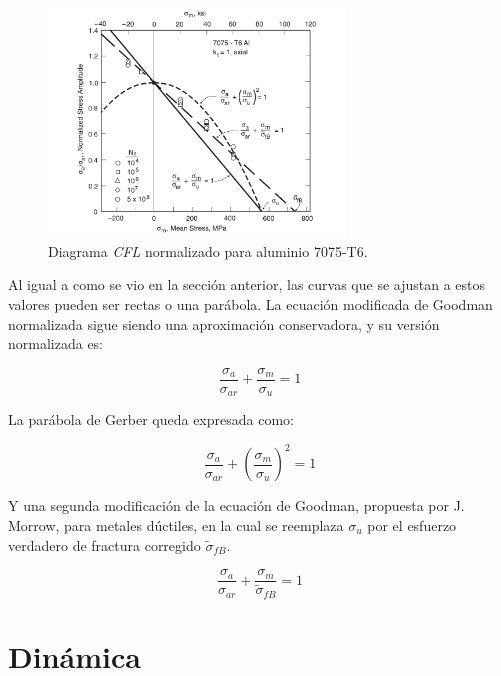\begin{figure}[h]
\centering
\includegraphics[width=0.7\textwidth]{Imagenes/cfl_norm.pdf}
\caption{Diagrama \textit{CFL} normalizado para aluminio 7075-T6. \cite{dowling2013mechanical}}
\label{fig:cfl_norm}
\end{figure}

Al igual a como se vio en la sección anterior, las curvas que se ajustan a estos valores pueden ser rectas o una parábola. La ecuación modificada de Goodman normalizada sigue siendo una aproximación conservadora, y su versión normalizada es:

\begin{equation} \label{eq:good_norm}
	\frac{\sigma_a}{\sigma_{ar}} + \frac{\sigma_m}{\sigma_u} = 1 
\end{equation}

La parábola de Gerber queda expresada como:

\begin{equation} \label{eq:par_gerber}
	\frac{\sigma_a}{\sigma_{ar}} + \left(\frac{\sigma_m}{\sigma_u}\right)^2 = 1 
\end{equation}

Y una segunda modificación de la ecuación de Goodman, propuesta por J. Morrow, para metales dúctiles, en la cual se reemplaza $\sigma_u$ por el esfuerzo verdadero de fractura corregido $\tilde{\sigma}_{fB}$.

\begin{equation} \label{eq:mod_goodduct}
	\frac{\sigma_a}{\sigma_{ar}} + \frac{\sigma_m}{\tilde{\sigma}_{fB}} = 1 
\end{equation}

\newpage

\section{Dinámica}

